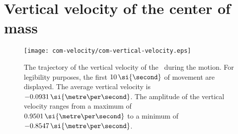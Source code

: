\chapter{Vertical velocity of the center of mass}%
\label{app:B}

\begin{figure}[htb]%
    \centering%
    \texttt{[image: com-velocity/com-vertical-velocity.eps]}
    \caption{The trajectory of the vertical velocity of the~ during the motion. For legibility purposes, the first $10\,\textrm{\si{\second}}$ of movement are displayed. The average vertical velocity is $-0.0931\,\textrm{\si{\metre\per\second}}$. The amplitude of the vertical velocity ranges from a maximum of $0.9501\,\textrm{\si{\metre\per\second}}$ to a minimum of $-0.8547\,\textrm{\si{\metre\per\second}}$.}%
    \label{fig:com-vertical-velocity}%
\end{figure}%
